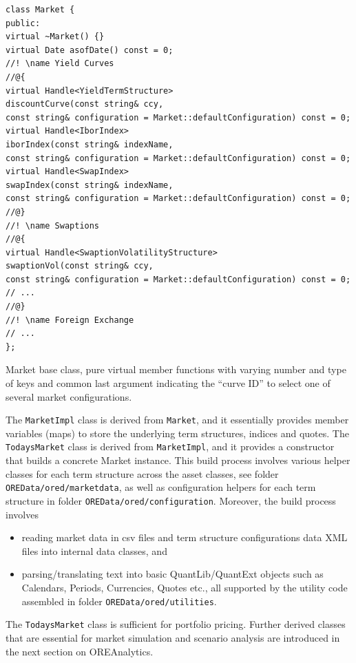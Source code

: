 \documentclass[12pt, a4paper]{article}
\begin{document}
\begin{listing}[H]
\begin{verbatim}
class Market {
public:
virtual ~Market() {}
virtual Date asofDate() const = 0;
//! \name Yield Curves
//@{
virtual Handle<YieldTermStructure>
discountCurve(const string& ccy,
const string& configuration = Market::defaultConfiguration) const = 0;
virtual Handle<IborIndex>
iborIndex(const string& indexName,
const string& configuration = Market::defaultConfiguration) const = 0;
virtual Handle<SwapIndex>
swapIndex(const string& indexName,
const string& configuration = Market::defaultConfiguration) const = 0;
//@}
//! \name Swaptions
//@{
virtual Handle<SwaptionVolatilityStructure>
swaptionVol(const string& ccy,
const string& configuration = Market::defaultConfiguration) const = 0;
// ...
//@}
//! \name Foreign Exchange
// ...
};
\end{verbatim}
\caption{Market base class, pure virtual member functions with varying number and type of keys and common last argument indicating the ``curve ID'' to select one of several market configurations.}
\label{1st:marketdata}
\end{listing}

The {\tt MarketImpl} class is derived from {\tt Market}, and it essentially provides member variables (maps) to store the underlying term structures, indices and quotes.
The {\tt TodaysMarket} class is derived from {\tt MarketImpl}, and it provides a constructor that builds a concrete Market instance. 
This build process involves various helper classes for each term structure across the asset classes, see folder {\tt OREData/ored/marketdata}, as well as configuration helpers for each term structure in folder {\tt OREData/ored/configuration}. Moreover, the build process involves
\begin{itemize}
\item reading market data in csv files and term structure configurations data XML files into internal data classes, and
\item parsing/translating text into basic QuantLib/QuantExt objects such as Calendars, Periods, Currencies, Quotes etc., all supported by the utility code assembled in folder {\tt OREData/ored/utilities}.
\end{itemize}
The {\tt TodaysMarket} class is sufficient for portfolio pricing. Further derived classes that are essential for market simulation and scenario analysis are introduced in the next section on OREAnalytics.
\end{document}
